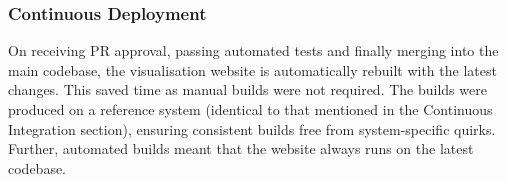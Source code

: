 \subsubsection{Continuous Deployment}

On receiving PR approval, passing automated tests and finally merging into the main codebase, the visualisation website is automatically rebuilt with the latest changes. This saved time as manual builds were not required. The builds were produced on a reference system (identical to that mentioned in the Continuous Integration section), ensuring consistent builds free from system-specific quirks. Further, automated builds meant that the website always runs on the latest codebase.